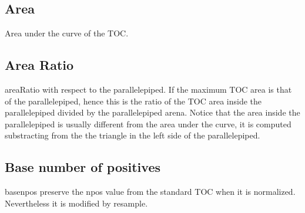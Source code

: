 \documentclass[letterpaper,10pt,english]{sphinxmanual}
\begin{document}
\subsection{Area}
\label{\detokenize{usage:area}}

\begin{fulllineitems}
\label{\detokenize{usage:ootoc.TOC.area}}
\pysigstartsignatures
{}
\pysigstopsignatures
\sphinxAtStartPar
Area under the curve of the TOC.

\end{fulllineitems}



\subsection{Area Ratio}
\label{\detokenize{usage:area-ratio}}

\begin{fulllineitems}
\label{\detokenize{usage:ootoc.TOC.areaRatio}}
\pysigstartsignatures
{}
\pysigstopsignatures
\sphinxAtStartPar
areaRatio with respect to the parallelepiped. If the maximum TOC area is that of the parallelepiped, hence this is the ratio of the TOC area inside the parallelepiped divided by the parallelepiped arena.
Notice that the area inside the parallelepiped is usually different from the area under the curve, it is computed substracting from the  the triangle in the left side of the parallelepiped.

\end{fulllineitems}



\subsection{Base number of positives}
\label{\detokenize{usage:base-number-of-positives}}

\begin{fulllineitems}
\label{\detokenize{usage:ootoc.TOC.basenpos}}
\pysigstartsignatures
{}
\pysigstopsignatures
\sphinxAtStartPar
basenpos preserve the npos value from the standard TOC when it is normalized. Nevertheless it is modified by resample.

\end{fulllineitems}
\end{document}
